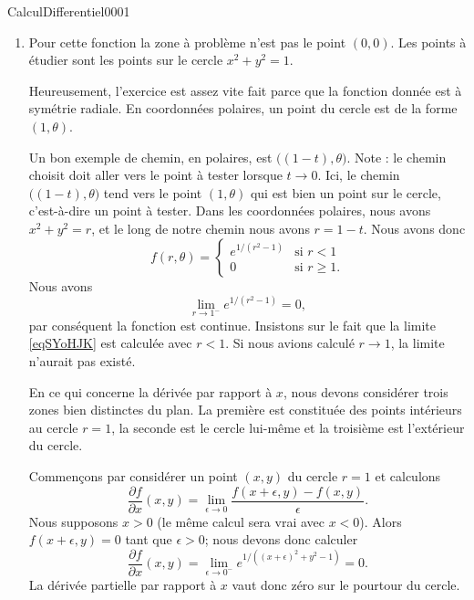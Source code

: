 \begin{corrige}{CalculDifferentiel0001}
\begin{enumerate}
		\item
			Pour cette fonction la zone à problème n'est pas le point $(0,0)$. Les points à étudier sont les points sur le cercle $x^2+y^2=1$.

			Heureusement, l'exercice est assez vite fait parce que la fonction donnée est à symétrie radiale. En coordonnées polaires, un point du cercle est de la forme $(1,\theta)$. 
            
            Un bon exemple de chemin, en polaires, est $\big( (1-t),\theta \big)$. Note : le chemin choisit doit aller vers le point à tester lorsque $t\to 0$. Ici, le chemin $\big( (1-t),\theta \big)$ tend vers le point $(1,\theta)$ qui est bien un point sur le cercle, c'est-à-dire un point à tester. Dans les coordonnées polaires, nous avons $x^2+y^2=r$, et le long de notre chemin nous avons $r=1-t$. Nous avons donc
			\begin{equation}
                f(r,\theta)= \begin{cases}
                    e^{1/(r^2-1)}    &   \text{si } r<1\\
                    0    &    \text{si } r\geq 1.
                \end{cases}
			\end{equation}
            Nous avons
            \begin{equation}        \label{eqSYoHJK}
                \lim_{r\to 1^-} e^{1/(r^2-1)}=0,
            \end{equation}
            par conséquent la fonction est continue. Insistons sur le fait que la limite \eqref{eqSYoHJK} est calculée avec \( r<1\). Si nous avions calculé \( r\to 1\), la limite n'aurait pas existé.

            En ce qui concerne la dérivée par rapport à \( x\), nous devons considérer trois zones bien distinctes du plan. La première est constituée des points intérieurs au cercle \( r=1\), la seconde est le cercle lui-même et la troisième est l'extérieur du cercle.
            
            Commençons par considérer un point \( (x,y)\) du cercle \( r=1\) et calculons
            \begin{equation}
                \frac{ \partial f }{ \partial x }(x,y)=\lim_{\epsilon\to 0}\frac{ f(x+\epsilon,y)-f(x,y) }{ \epsilon }.
            \end{equation}
            Nous supposons \( x>0\) (le même calcul sera vrai avec \( x<0\)). Alors \( f(x+\epsilon,y)=0\) tant que \( \epsilon>0\); nous devons donc calculer
            \begin{equation}
                \frac{ \partial f }{ \partial x }(x,y)=\lim_{\epsilon\to 0^-} e^{1/((x+\epsilon)^2+y^2-1 )}=0.
            \end{equation}
            La dérivée partielle par rapport à \( x\) vaut donc zéro sur le pourtour du cercle. 
            

\end{enumerate}
\end{corrige}
